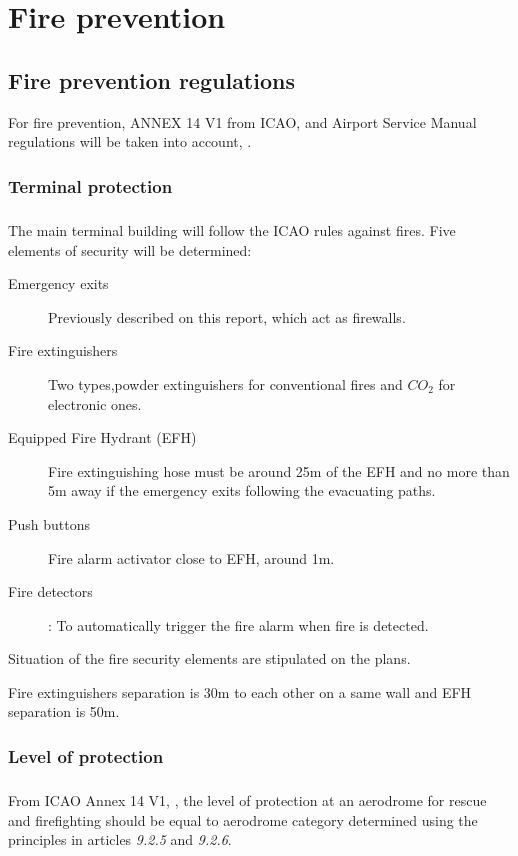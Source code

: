 \chapter{Fire prevention}
	\section{Fire prevention regulations }
	For fire prevention, ANNEX 14 V1 from ICAO, \cite{Standards2016} and Airport Service Manual regulations will be taken into account, \cite{InternationalCivilAviationOrganisation2014}.
		\subsection{Terminal protection}
		\paragraph{} The main terminal building will follow the ICAO rules against fires. Five elements of security will be determined:
		
		\begin{description}
			\item[Emergency exits] Previously described on this report, which act as firewalls.
			\item[Fire extinguishers] Two types,powder extinguishers for conventional fires and $CO_2$ for electronic ones.
			\item[Equipped Fire Hydrant (EFH)] Fire extinguishing hose must be around 25m of the EFH and no more than 5m away if the emergency exits following the evacuating paths.
			\item[Push buttons] Fire alarm activator close to EFH, around 1m.
			\item[Fire detectors]: To automatically trigger the fire alarm when fire is detected.
		\end{description}
	Situation of the fire security elements are stipulated on the plans.
	
	Fire extinguishers separation is 30m to each other on a same wall and EFH separation is 50m.
	
		\subsection{Level of protection}
		\paragraph{} From ICAO Annex 14 V1, \cite{Standards2016}, the level of protection at an aerodrome for rescue and firefighting should be equal to aerodrome category determined using the principles in articles \textit{9.2.5} and \textit{9.2.6}.
		
